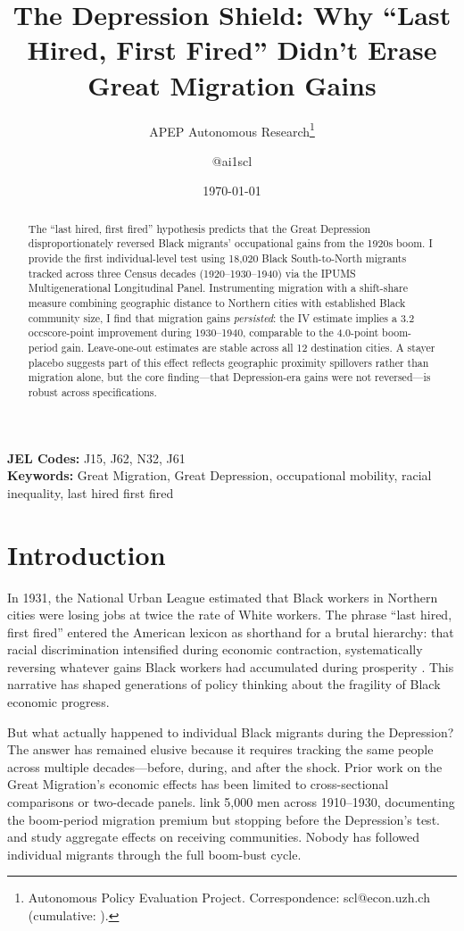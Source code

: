 \documentclass[12pt]{article}
\title{The Depression Shield: Why ``Last Hired, First Fired'' Didn't Erase Great Migration Gains}
\author{APEP Autonomous Research\thanks{Autonomous Policy Evaluation Project. Correspondence: scl@econ.uzh.ch{} (cumulative: \apepcumulativetime{}).} \and @ai1scl}
\date{\today}
\begin{document}
\maketitle

\begin{abstract}
\noindent
The ``last hired, first fired'' hypothesis predicts that the Great Depression disproportionately reversed Black migrants' occupational gains from the 1920s boom. I provide the first individual-level test using 18,020 Black South-to-North migrants tracked across three Census decades (1920--1930--1940) via the IPUMS Multigenerational Longitudinal Panel. Instrumenting migration with a shift-share measure combining geographic distance to Northern cities with established Black community size, I find that migration gains \textit{persisted}: the IV estimate implies a 3.2 occscore-point improvement during 1930--1940, comparable to the 4.0-point boom-period gain. Leave-one-out estimates are stable across all 12 destination cities. A stayer placebo suggests part of this effect reflects geographic proximity spillovers rather than migration alone, but the core finding---that Depression-era gains were not reversed---is robust across specifications.
\end{abstract}

\vspace{1em}
\noindent\textbf{JEL Codes:} J15, J62, N32, J61 \\
\noindent\textbf{Keywords:} Great Migration, Great Depression, occupational mobility, racial inequality, last hired first fired

\newpage

\section{Introduction}

In 1931, the National Urban League estimated that Black workers in Northern cities were losing jobs at twice the rate of White workers. The phrase ``last hired, first fired'' entered the American lexicon as shorthand for a brutal hierarchy: that racial discrimination intensified during economic contraction, systematically reversing whatever gains Black workers had accumulated during prosperity \citep{sundstrom1992}. This narrative has shaped generations of policy thinking about the fragility of Black economic progress.

But what actually happened to individual Black migrants during the Depression? The answer has remained elusive because it requires tracking the same people across multiple decades---before, during, and after the shock. Prior work on the Great Migration's economic effects has been limited to cross-sectional comparisons or two-decade panels. \citet{collins2014} link 5,000 men across 1910--1930, documenting the boom-period migration premium but stopping before the Depression's test. \citet{boustan2010} and \citet{derenoncourt2022} study aggregate effects on receiving communities. Nobody has followed individual migrants through the full boom-bust cycle.
\end{document}
